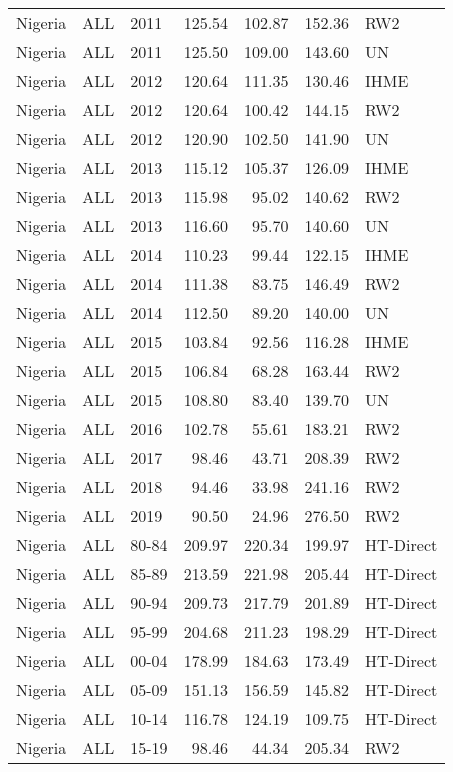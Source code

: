 \begin{longtable}{lllrrrl}
  Nigeria & ALL & 2011 & 125.54 & 102.87 & 152.36 & RW2 \\ 
  Nigeria & ALL & 2011 & 125.50 & 109.00 & 143.60 & UN \\ 
  Nigeria & ALL & 2012 & 120.64 & 111.35 & 130.46 & IHME \\ 
  Nigeria & ALL & 2012 & 120.64 & 100.42 & 144.15 & RW2 \\ 
  Nigeria & ALL & 2012 & 120.90 & 102.50 & 141.90 & UN \\ 
  Nigeria & ALL & 2013 & 115.12 & 105.37 & 126.09 & IHME \\ 
  Nigeria & ALL & 2013 & 115.98 & 95.02 & 140.62 & RW2 \\ 
  Nigeria & ALL & 2013 & 116.60 & 95.70 & 140.60 & UN \\ 
  Nigeria & ALL & 2014 & 110.23 & 99.44 & 122.15 & IHME \\ 
  Nigeria & ALL & 2014 & 111.38 & 83.75 & 146.49 & RW2 \\ 
  Nigeria & ALL & 2014 & 112.50 & 89.20 & 140.00 & UN \\ 
  Nigeria & ALL & 2015 & 103.84 & 92.56 & 116.28 & IHME \\ 
  Nigeria & ALL & 2015 & 106.84 & 68.28 & 163.44 & RW2 \\ 
  Nigeria & ALL & 2015 & 108.80 & 83.40 & 139.70 & UN \\ 
  Nigeria & ALL & 2016 & 102.78 & 55.61 & 183.21 & RW2 \\ 
  Nigeria & ALL & 2017 & 98.46 & 43.71 & 208.39 & RW2 \\ 
  Nigeria & ALL & 2018 & 94.46 & 33.98 & 241.16 & RW2 \\ 
  Nigeria & ALL & 2019 & 90.50 & 24.96 & 276.50 & RW2 \\ 
  Nigeria & ALL & 80-84 & 209.97 & 220.34 & 199.97 & HT-Direct \\ 
  Nigeria & ALL & 85-89 & 213.59 & 221.98 & 205.44 & HT-Direct \\ 
  Nigeria & ALL & 90-94 & 209.73 & 217.79 & 201.89 & HT-Direct \\ 
  Nigeria & ALL & 95-99 & 204.68 & 211.23 & 198.29 & HT-Direct \\ 
  Nigeria & ALL & 00-04 & 178.99 & 184.63 & 173.49 & HT-Direct \\ 
  Nigeria & ALL & 05-09 & 151.13 & 156.59 & 145.82 & HT-Direct \\ 
  Nigeria & ALL & 10-14 & 116.78 & 124.19 & 109.75 & HT-Direct \\ 
  Nigeria & ALL & 15-19 & 98.46 & 44.34 & 205.34 & RW2 \\ 

\end{longtable}
